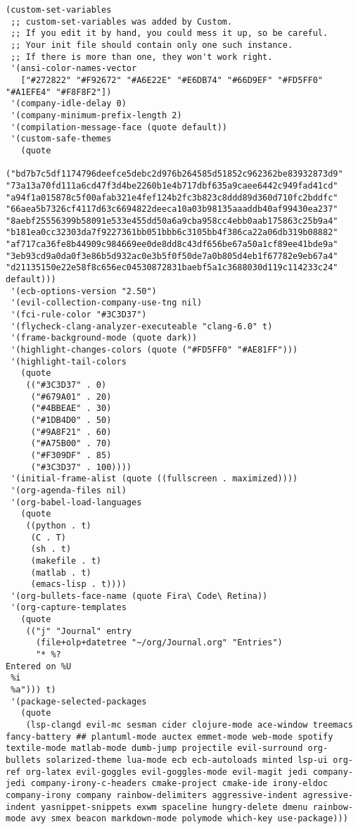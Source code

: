 \documentclass[11pt]{article}
\begin{document}
\begin{verbatim}
(custom-set-variables
 ;; custom-set-variables was added by Custom.
 ;; If you edit it by hand, you could mess it up, so be careful.
 ;; Your init file should contain only one such instance.
 ;; If there is more than one, they won't work right.
 '(ansi-color-names-vector
   ["#272822" "#F92672" "#A6E22E" "#E6DB74" "#66D9EF" "#FD5FF0" "#A1EFE4" "#F8F8F2"])
 '(company-idle-delay 0)
 '(company-minimum-prefix-length 2)
 '(compilation-message-face (quote default))
 '(custom-safe-themes
   (quote
    ("bd7b7c5df1174796deefce5debc2d976b264585d51852c962362be83932873d9" "73a13a70fd111a6cd47f3d4be2260b1e4b717dbf635a9caee6442c949fad41cd" "a94f1a015878c5f00afab321e4fef124b2fc3b823c8ddd89d360d710fc2bddfc" "66aea5b7326cf4117d63c6694822deeca10a03b98135aaaddb40af99430ea237" "8aebf25556399b58091e533e455dd50a6a9cba958cc4ebb0aab175863c25b9a4" "b181ea0cc32303da7f9227361bb051bbb6c3105bb4f386ca22a06db319b08882" "af717ca36fe8b44909c984669ee0de8dd8c43df656be67a50a1cf89ee41bde9a" "3eb93cd9a0da0f3e86b5d932ac0e3b5f0f50de7a0b805d4eb1f67782e9eb67a4" "d21135150e22e58f8c656ec04530872831baebf5a1c3688030d119c114233c24" default)))
 '(ecb-options-version "2.50")
 '(evil-collection-company-use-tng nil)
 '(fci-rule-color "#3C3D37")
 '(flycheck-clang-analyzer-executeable "clang-6.0" t)
 '(frame-background-mode (quote dark))
 '(highlight-changes-colors (quote ("#FD5FF0" "#AE81FF")))
 '(highlight-tail-colors
   (quote
    (("#3C3D37" . 0)
     ("#679A01" . 20)
     ("#4BBEAE" . 30)
     ("#1DB4D0" . 50)
     ("#9A8F21" . 60)
     ("#A75B00" . 70)
     ("#F309DF" . 85)
     ("#3C3D37" . 100))))
 '(initial-frame-alist (quote ((fullscreen . maximized))))
 '(org-agenda-files nil)
 '(org-babel-load-languages
   (quote
    ((python . t)
     (C . T)
     (sh . t)
     (makefile . t)
     (matlab . t)
     (emacs-lisp . t))))
 '(org-bullets-face-name (quote Fira\ Code\ Retina))
 '(org-capture-templates
   (quote
    (("j" "Journal" entry
      (file+olp+datetree "~/org/Journal.org" "Entries")
      "* %?
Entered on %U
 %i
 %a"))) t)
 '(package-selected-packages
   (quote
    (lsp-clangd evil-mc sesman cider clojure-mode ace-window treemacs fancy-battery ## plantuml-mode auctex emmet-mode web-mode spotify textile-mode matlab-mode dumb-jump projectile evil-surround org-bullets solarized-theme lua-mode ecb ecb-autoloads minted lsp-ui org-ref org-latex evil-goggles evil-goggles-mode evil-magit jedi company-jedi company-irony-c-headers cmake-project cmake-ide irony-eldoc company-irony company rainbow-delimiters aggressive-indent agressive-indent yasnippet-snippets exwm spaceline hungry-delete dmenu rainbow-mode avy smex beacon markdown-mode polymode which-key use-package)))

\end{verbatim}
\end{document}
